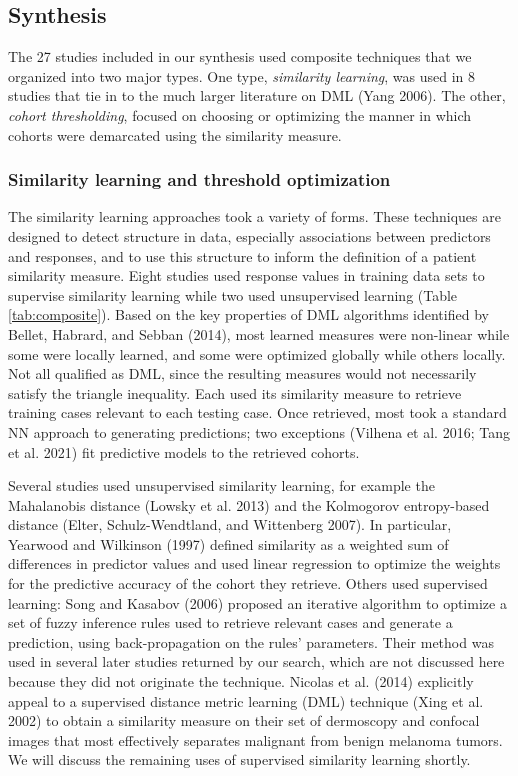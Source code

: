 \documentclass{article}
\begin{document}
\hypertarget{synthesis-1}{%
\subsection{Synthesis}\label{synthesis-1}}

The 27 studies included in our synthesis used composite techniques that
we organized into two major types. One type, \emph{similarity learning},
was used in 8 studies that tie in to the much larger literature on DML
(Yang 2006). The other, \emph{cohort thresholding}, focused on choosing
or optimizing the manner in which cohorts were demarcated using the
similarity measure.

\hypertarget{similarity-learning-and-threshold-optimization}{%
\subsubsection{Similarity learning and threshold
optimization}\label{similarity-learning-and-threshold-optimization}}

The similarity learning approaches took a variety of forms. These
techniques are designed to detect structure in data, especially
associations between predictors and responses, and to use this structure
to inform the definition of a patient similarity measure. Eight studies
used response values in training data sets to supervise similarity
learning while two used unsupervised learning (Table
\ref{tab:composite}). Based on the key properties of DML algorithms
identified by Bellet, Habrard, and Sebban (2014), most learned measures
were non-linear while some were locally learned, and some were optimized
globally while others locally. Not all qualified as DML, since the
resulting measures would not necessarily satisfy the triangle
inequality. Each used its similarity measure to retrieve training cases
relevant to each testing case. Once retrieved, most took a standard NN
approach to generating predictions; two exceptions (Vilhena et al. 2016;
Tang et al. 2021) fit predictive models to the retrieved cohorts.

Several studies used unsupervised similarity learning, for example the
Mahalanobis distance (Lowsky et al. 2013) and the Kolmogorov
entropy-based distance (Elter, Schulz-Wendtland, and Wittenberg 2007).
In particular, Yearwood and Wilkinson (1997) defined similarity as a
weighted sum of differences in predictor values and used linear
regression to optimize the weights for the predictive accuracy of the
cohort they retrieve. Others used supervised learning: Song and Kasabov
(2006) proposed an iterative algorithm to optimize a set of fuzzy
inference rules used to retrieve relevant cases and generate a
prediction, using back-propagation on the rules' parameters. Their
method was used in several later studies returned by our search, which
are not discussed here because they did not originate the technique.
Nicolas et al. (2014) explicitly appeal to a supervised distance metric
learning (DML) technique (Xing et al. 2002) to obtain a similarity
measure on their set of dermoscopy and confocal images that most
effectively separates malignant from benign melanoma tumors. We will
discuss the remaining uses of supervised similarity learning shortly.
\end{document}
